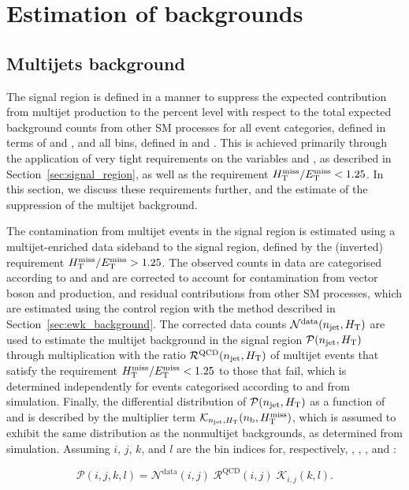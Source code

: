 \section{Estimation of backgrounds}
\label{sec:backgrounds}

\subsection{Multijets background}
\label{sec:qcd_background}

The signal region is defined in a manner to suppress the expected
contribution from multijet production to the percent level with
respect to the total expected background counts from other SM
processes for all event categories, defined in terms of \njet and \nb,
and all bins, defined in \scalht and \HTmiss. This is achieved
primarily through the application of very tight requirements on the
variables \alphat and \dphi, as described in
Section~\ref{sec:signal_region}, as well as the requirement $H_{\mathrm{T}}^{\text{miss}} / E_{\mathrm{T}}^{\text{miss}} <
1.25$. In this section, we discuss these requirements further, and the
estimate of the suppression of the multijet background.

The contamination from multijet events in the signal region is
estimated using a multijet-enriched data sideband to the signal
region, defined by the (inverted) requirement $H_{\mathrm{T}}^{\text{miss}} / E_{\mathrm{T}}^{\text{miss}} > 1.25$. The
observed counts in data are categorised according to \njet and \scalht
and are corrected to account for contamination from vector boson and
\ttbar production, and residual contributions from other SM processes,
which are estimated using the \mj control region with the method
described in Section~\ref{sec:ewk_background}.  The corrected data
counts $\mathcal{N}^\text{data}(n_{\text{jet}}, H_{\mathrm{T}})$ are used to estimate
the multijet background in the signal region $\mathcal{P}(n_{\text{jet}},
H_{\mathrm{T}})$ through multiplication with the ratio
$\mathcal{R}^\text{QCD}(n_{\text{jet}}, H_{\mathrm{T}})$ of multijet events that
satisfy the requirement $H_{\mathrm{T}}^{\text{miss}} / E_{\mathrm{T}}^{\text{miss}} < 1.25$ to those that fail, which is
determined independently for events categorised according to \njet and
\scalht from simulation. Finally, the differential distribution of
$\mathcal{P}(n_{\text{jet}}, H_{\mathrm{T}})$ as a function of \nb and \HTmiss is
described by the multiplier term $\mathcal{K}_{n_{\text{jet}}, H_{\mathrm{T}}}(n_{\text{b}},
H_{\text{T}}^{\text{miss}})$, which is assumed to exhibit the same distribution as the
nonmultijet backgrounds, as determined from simulation. Assuming $i$,
$j$, $k$, and $l$ are the bin indices for, respectively, \njet,
\scalht, \nb, and \HTmiss:

\begin{equation}
  \label{eq:qcd}
  \mathcal{P}( i, j, k, l ) =
  \mathcal{N}^\text{data}( i, j )\;
  \mathcal{R}^\text{QCD}( i, j )\;
  \mathcal{K}_{i,j}( k, l ).
\end{equation}

